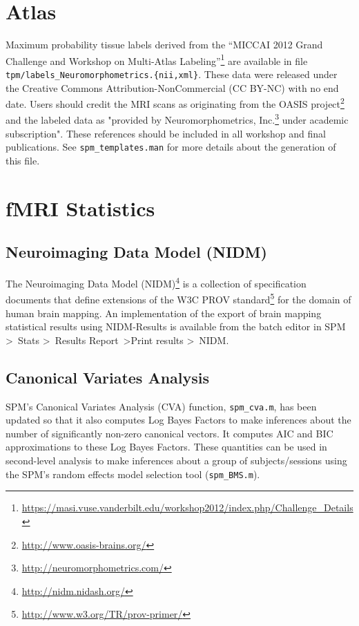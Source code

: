 \documentclass[a4paper,titlepage,openany]{article}
\begin{document}
\section{Atlas}

Maximum probability tissue labels derived from the ``MICCAI 2012 Grand Challenge and Workshop on Multi-Atlas Labeling''\footnote{\url{https://masi.vuse.vanderbilt.edu/workshop2012/index.php/Challenge_Details}} are available in file \texttt{tpm/labels\_Neuromorphometrics.\{nii,xml\}}.
These data were released under the Creative Commons Attribution-NonCommercial (CC BY-NC) with no end date. Users should credit the MRI scans as originating from the OASIS project\footnote{\url{http://www.oasis-brains.org/}} and the labeled data as "provided by Neuromorphometrics, Inc.\footnote{\url{http://neuromorphometrics.com/}} under academic subscription". These references should be included in all workshop and final publications.
See \texttt{spm\_templates.man} for more details about the generation of this file.

\section{fMRI Statistics}

\subsection{Neuroimaging Data Model (NIDM)}

The Neuroimaging Data Model (NIDM)\footnote{\url{http://nidm.nidash.org/}} is a collection of specification documents that define extensions of the W3C PROV standard\footnote{\url{http://www.w3.org/TR/prov-primer/}} for the domain of human brain mapping.
An implementation of the export of brain mapping statistical results using NIDM-Results \cite{Maumet2014} is available from the batch editor in SPM \textgreater\ Stats \textgreater\ Results Report\ \textgreater Print results \textgreater\ NIDM.

\subsection{Canonical Variates Analysis}

SPM's Canonical Variates Analysis (CVA) function, \texttt{spm\_cva.m}, has been updated so that it also computes Log Bayes Factors to make inferences about the number of significantly non-zero canonical vectors. It computes AIC and BIC approximations to these Log Bayes Factors. These quantities can be used in second-level analysis to make inferences about a group of subjects/sessions using the SPM's random effects model selection tool (\texttt{spm\_BMS.m}).
\end{document}
